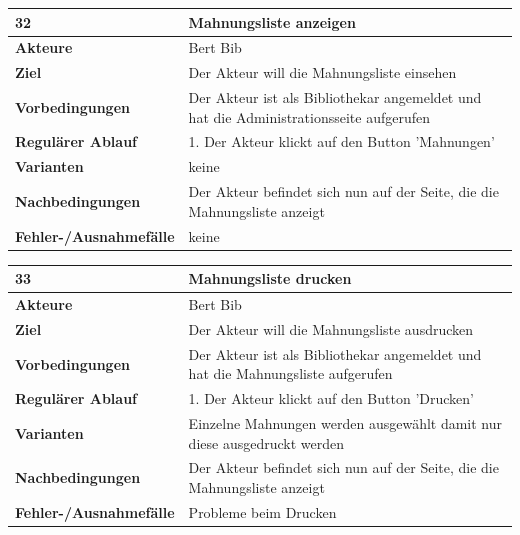 \documentclass[fontsize=12pt,paper=a4,twoside]{scrartcl}
\begin{document}
\begin{table}[htbp]
\label{32}
\begin{tabular}{|l|p{10cm}|}
\hline 
\textbf{32} & \textbf{Mahnungsliste anzeigen} \\ \hline
\textbf{Akteure} & Bert Bib\\ \hline
\textbf{Ziel} & Der Akteur will die Mahnungsliste einsehen \\ \hline
\textbf{Vorbedingungen} & Der Akteur ist als Bibliothekar angemeldet und hat die Administrationsseite 
aufgerufen \\ \hline
\textbf{Regulärer Ablauf} & 
1. Der Akteur klickt auf den Button 'Mahnungen' \\
\hline
\textbf{Varianten} & 
keine \\ \hline
\textbf{Nachbedingungen} & Der Akteur befindet sich nun auf der Seite, die die Mahnungsliste 
anzeigt\\ \hline
\textbf{Fehler-/Ausnahmefälle} & keine\\
\hline
\end{tabular}
\end{table}

\begin{table}[htbp]
\label{33}
\begin{tabular}{|l|p{10cm}|}
\hline 
\textbf{33} & \textbf{Mahnungsliste drucken} \\ \hline
\textbf{Akteure} & Bert Bib\\ \hline
\textbf{Ziel} & Der Akteur will die Mahnungsliste ausdrucken \\ \hline
\textbf{Vorbedingungen} & Der Akteur ist als Bibliothekar angemeldet und hat die Mahnungsliste 
aufgerufen \\ \hline
\textbf{Regulärer Ablauf} & 
1. Der Akteur klickt auf den Button 'Drucken' \\
\hline
\textbf{Varianten} & 
Einzelne Mahnungen werden ausgewählt damit nur diese ausgedruckt werden \\ \hline
\textbf{Nachbedingungen} & Der Akteur befindet sich nun auf der Seite, die die Mahnungsliste 
anzeigt\\ \hline
\textbf{Fehler-/Ausnahmefälle} & Probleme beim Drucken\\
\hline
\end{tabular}
\end{table}
\end{document}
